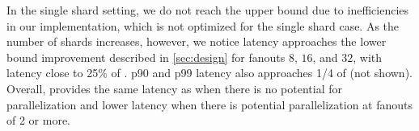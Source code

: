 In the single shard setting, we do not reach the upper bound due to inefficiencies in our implementation, which is not optimized for the single shard case.
%
As the number of shards increases, however, we notice latency approaches the lower bound improvement
described in \cref{sec:design} for fanouts $8$, $16$, and $32$, with latency
close to 25\% of \mpaxos{}. p90 and p99 latency also approaches 1/4 of \mpaxos{} (not shown).
%
Overall, \sys{} provides the same latency as \mpaxos{} when there is no potential for parallelization and lower latency when there is potential parallelization at fanouts of 2 or more.



